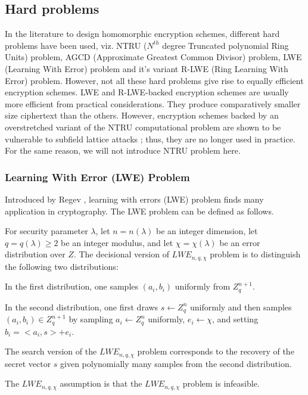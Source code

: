 \subsection{Hard problems}
In the literature to design homomorphic encryption schemes, different hard problems have been used, viz. NTRU ($N^{th}$ degree Truncated polynomial Ring Units) problem, AGCD (Approximate Greatest Common Divisor) problem, LWE (Learning With Error) problem and it's variant R-LWE (Ring Learning With Error) problem. However, not all these hard problems give rise to equally efficient encryption schemes. LWE and R-LWE-backed encryption schemes are usually more efficient from practical considerations. They produce comparatively smaller size ciphertext than the others. However, encryption schemes backed by an overstretched \cite{albrecht2016subfield} variant of the NTRU computational problem are shown to be vulnerable to subfield lattice attacks \cite{albrecht2016subfield,cheon2016algorithm}; thus, they are no longer used in practice. For the same reason, we will not introduce NTRU problem here.


\subsubsection{Learning With Error (LWE) Problem}
Introduced by Regev \cite{regev2009lattices}, learning with errors (LWE) problem finds many application in cryptography. The LWE problem can be defined as follows.

\begin{definition}For security parameter $\lambda$, let $n = n(\lambda)$ be an integer dimension, let $q = q(\lambda) \geq 2$ be an integer modulus, and let $\chi = \chi(\lambda)$ be an error distribution over $Z$. The decisional version of $LWE_{n,q,\chi}$ problem is to distinguish the following two distributions:

    In the first distribution, one samples $(a_i, b_i)$ uniformly from $Z^{n+1}_q$.

    In the second distribution, one first draws $s \leftarrow Z^n_q$ uniformly and then samples $(a_i, b_i) \in Z^{n+1}_q$ by sampling $a_i \leftarrow Z^n_q$ uniformly, $e_i \leftarrow \chi$, and setting $b_i = <a_i,s> + e_i$.

    The search version of the $LWE_{n,q,\chi}$ problem corresponds to the recovery of the secret vector $s$ given polynomially many samples from the second distribution.

    The $LWE_{n,q,\chi}$ assumption is that the $LWE_{n,q,\chi}$ problem is infeasible.
\end{definition}

